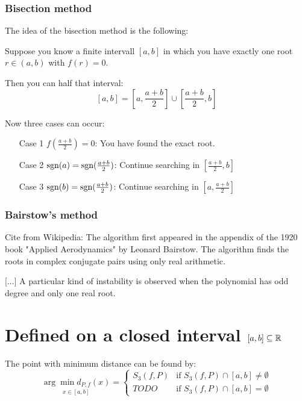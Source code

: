 \subsubsection{Bisection method}
The idea of the bisection method is the following:

Suppose you know a finite intervall $[a,b]$ in which you have 
exactly one root $r \in (a,b)$ with $f(r) = 0$.

Then you can half that interval:
    \[[a, b] = \left [a, \frac{a+b}{2} \right ] \cup \left [\frac{a+b}{2}, b \right ]\]

Now three cases can occur:
\begin{enumerate}
    \item[Case 1] $f(\frac{a+b}{2})=0$: You have found the exact root.
    \item[Case 2] $\text{sgn}(a) = \text{sgn}(\frac{a+b}{2})$: Continue searching in $[\frac{a+b}{2}, b]$
    \item[Case 3] $\text{sgn}(b) = \text{sgn}(\frac{a+b}{2})$: Continue searching in $[a, \frac{a+b}{2}]$
\end{enumerate}

\subsubsection{Bairstow's method}
Cite from Wikipedia:
The algorithm first appeared in the appendix of the 1920 book "Applied Aerodynamics" by Leonard Bairstow. The algorithm finds the roots in complex conjugate pairs using only real arithmetic.

[...]
A particular kind of instability is observed when the polynomial has odd degree and only one real root.



\section{Defined on a closed interval $[a,b] \subseteq \mathbb{R}$}
The point with minimum distance can be found by:
\[\underset{x\in[a,b]}{\arg \min d_{P,f}(x)} = \begin{cases}
 S_3(f, P) &\text{if } S_3(f, P) \cap [a,b] \neq \emptyset\\
  TODO     &\text{if } S_3(f, P) \cap [a,b] = \emptyset
    \end{cases}\]
